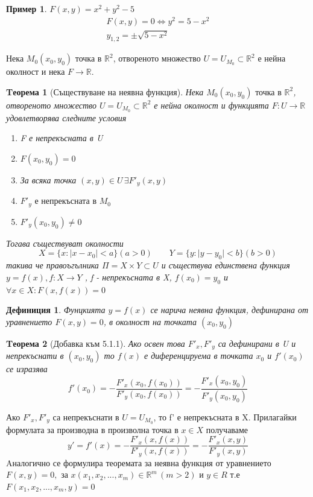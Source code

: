 \documentclass[a4paper,fleqn,12pt]{article}
\newtheorem{theorem}{Tеорема}[subsection]
\newtheorem{definition}{Дефиниция}[subsection]
\theoremstyle{definition}
\newtheorem{example}{Пример}[subsection]
\begin{document}
\begin{example}
$F(x,y) = x^2 +y^2 - 5$
\begin{gather*}
F(x,y) = 0 \iff  y^2 = 5-x^2 \\
y_{1,2} = \pm \sqrt{5-x^2}
\end{gather*}
\end{example}
Нека $M_0 (x_0, y_0) \text{ точка в } \mathbb{R}^2$, отвореното множество $U = U_{M_0} \subset \mathbb{R}^2$ е нейна околност и нека $F \to \mathbb{R}$. 

\begin{theorem}[Съществуване на неявна функция]
Нека $M_0 (x_0, y_0) \text{ точка в } \mathbb{R}^2$, отвореното множество $U = U_{M_0} \subset \mathbb{R}^2$ е нейна околност и функцията $F: U \to \mathbb{R}$ удовлетворява следните условия
\begin{enumerate}

\item F е непрекъсната в U

\item $F(x_0, y_0) = 0$

\item За всяка точка $(x, y) \in U \, \exists F'_y(x,y)$

\item $F'_y \text{ е непрекъсната в } M_0$

\item $F'_y (x_0, y_0) \neq 0$
\end{enumerate}
Тогава съществуват околности
$$X = \{x: \vert x - x_0 \vert < a\} (a>0) \qquad Y = \{y: \vert y - y_0 \vert < b\} (b>0)$$
такива че правоъгълника $\Pi = X \times Y \subset U$ и съществува единствена функция $y = f(x), f: X \to Y$ , f - непрекъсната в X, $f(x_0) = y_0$ и $\forall x \in X: F(x,f(x)) = 0 $ 
\end{theorem}

\begin{definition}
Фунцкията $y = f(x)$ се нарича неявна функция, дефинирана от уравнението $F(x,y) = 0$, в околност на точката $(x_0, y_0)$
\end{definition}


\begin{theorem}[Добавка към 5.1.1]
Ако освен това $F'_x, F'_y$ са дефинирани в U и непрекъснати в $(x_0, y_0)$ то $f(x)$ е диференцируема в точката $x_0$ и $f'(x_0)$ се изразява
$$f'(x_0) = - \dfrac{F'_x(x_0,f(x_0))}{F'_y(x_0,f(x_0))} = - \dfrac{F'_x(x_0,y_0)}{F'_y(x_0,y_0)} $$
\end{theorem}
Ако $F'_x, F'_y$ са непрекъснати в $U = U_{M_0}$, то f' е непрекъсната в X. Прилагайки формулата за производна в произволна точка в $x \in X$ получаваме
\begin{equation}
y' = f'(x) = - \dfrac{F'_x(x,f(x))}{F'_y(x,f(x))} = - \dfrac{F'_x(x,y)}{F'_y(x,y)}
\end{equation}
Aналогично се формулира теоремата за неявна функция от уравнението $F(x,y) = 0, \text{ за } x(x_1, x_2, ..., x_m) \in \mathbb{R}^m \, (m >2)$ и $y \in R$ т.е $F(x_1, x_2, ..., x_m, y) = 0$\\
\end{document}
